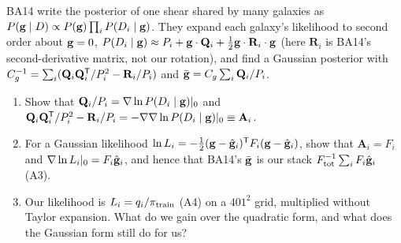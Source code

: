 
\begin{given}
BA14 write the posterior of one shear shared by many galaxies as $P(\mathbf{g}\mid D) \propto P(\mathbf{g})\prod_iP(D_i\mid\mathbf{g})$. They
expand each galaxy's likelihood to second order about $\mathbf{g} = 0$,
$P(D_i\mid\mathbf{g}) \approx P_i + \mathbf{g}\cdot\mathbf Q_i + \tfrac12\mathbf{g}\cdot\mathbf R_i\cdot\mathbf{g}$ (here $\mathbf R_i$ is BA14's
second-derivative matrix, not our rotation), and find a Gaussian posterior with
$C_g^{-1} = \sum_i(\mathbf Q_i\mathbf Q_i^{\mathsf{T}}/P_i^2 - \mathbf R_i/P_i)$ and $\bar{\mathbf{g}} = C_g\sum_i\mathbf Q_i/P_i$.
\end{given}


\begin{enumerate}
  \item Show that $\mathbf Q_i/P_i = \nabla\ln P(D_i\mid\mathbf{g})|_0$ and
    $\mathbf Q_i\mathbf Q_i^{\mathsf{T}}/P_i^2 - \mathbf R_i/P_i = -\nabla\nabla\ln P(D_i\mid\mathbf{g})|_0 \equiv \mathbf A_i$.
  \item For a Gaussian likelihood $\ln L_i = -\tfrac12(\mathbf{g} - \hat{\mathbf{g}}_i)^{\mathsf{T}} F_i(\mathbf{g} - \hat{\mathbf{g}}_i)$, show that $\mathbf A_i = F_i$
    and $\nabla\ln L_i|_0 = F_i\hat{\mathbf{g}}_i$, and hence that BA14's $\bar{\mathbf{g}}$ is our stack $F_{\rm tot}^{-1}\sum_iF_i\hat{\mathbf{g}}_i$ (A3).
  \item Our likelihood is $L_i = q_i/\pi_{\rm train}$ (A4) on a $401^2$ grid, multiplied without Taylor expansion. What do we gain
    over the quadratic form, and what does the Gaussian form still do for us?
\end{enumerate}



